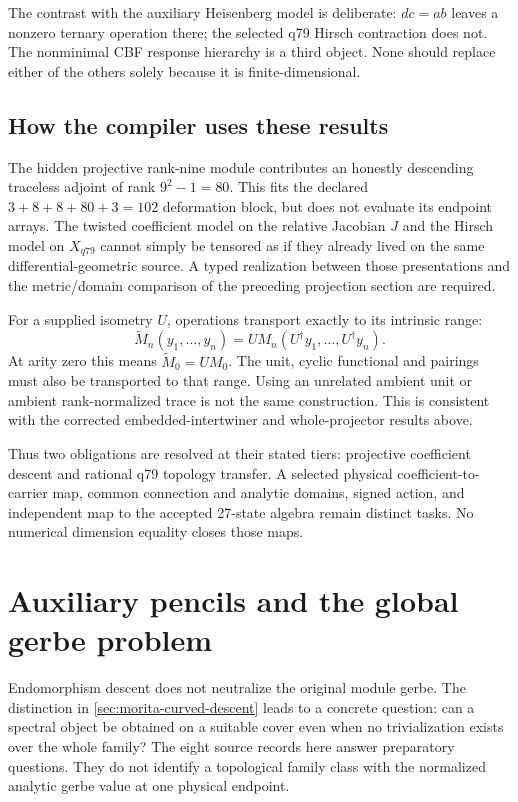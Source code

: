 \documentclass[11pt,a4paper]{article}
\begin{document}
The contrast with the auxiliary Heisenberg model is deliberate:
\(dc=ab\) leaves a nonzero ternary operation there; the selected q79
Hirsch contraction does not. The nonminimal CBF response hierarchy is a
third object. None should replace either of the others solely because it
is finite-dimensional.

\subsection{How the compiler uses these results}
\label{sec:morita-compiler-range}
The hidden projective rank-nine module contributes an honestly descending
traceless adjoint of rank \(9^2-1=80\). This fits the declared
\(3+8+8+80+3=102\) deformation block, but does not evaluate its endpoint
arrays. The twisted coefficient model on the relative Jacobian \(J\)
and the Hirsch model on \(X_{q79}\) cannot simply be tensored as if they
already lived on the same differential-geometric source. A typed
realization between those presentations and the metric/domain comparison
of the preceding projection section are required.

For a supplied isometry \(U\), operations transport exactly to its
intrinsic range:
\[
 \widetilde M_n(y_1,\ldots,y_n)
 =U M_n(U^\dagger y_1,\ldots,U^\dagger y_n).
\]
At arity zero this means \(\widetilde M_0=UM_0\). The unit, cyclic
functional and pairings must also be transported to that range.
Using an unrelated ambient unit or ambient rank-normalized trace is not
the same construction. This is consistent with the corrected
embedded-intertwiner and whole-projector results above.

Thus two obligations are resolved at their stated tiers: projective
coefficient descent and rational q79 topology transfer. A selected
physical coefficient-to-carrier map, common connection and analytic
domains, signed action, and independent map to the accepted 27-state
algebra remain distinct tasks. No numerical dimension equality closes
those maps.

\section{Auxiliary pencils and the global gerbe problem}
\label{sec:deligne-family}

Endomorphism descent does not neutralize the original module gerbe.
The distinction in \cref{sec:morita-curved-descent} leads to a concrete
question: can a spectral object be obtained on a suitable cover even
when no trivialization exists over the whole family? The eight source
records here answer preparatory questions. They do not identify a
topological family class with the normalized analytic gerbe value at
one physical endpoint.
\end{document}
